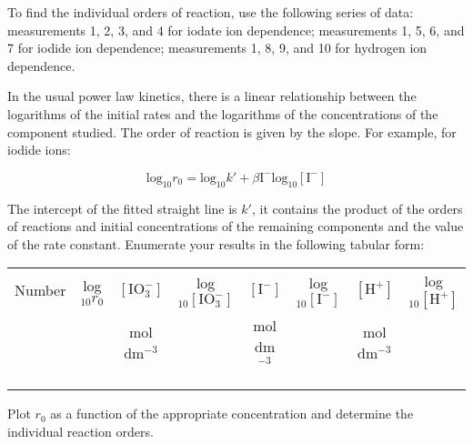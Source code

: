 To find the individual orders of reaction, use the following series of data: measurements 1, 2, 3, and 4 for iodate ion dependence; measurements 1, 5, 6, and 7 for iodide ion dependence; measurements 1, 8, 9, and 10 for hydrogen ion dependence.

In the usual power law kinetics, there is a linear relationship between the logarithms of the initial rates and the logarithms of the concentrations of the component studied. The order of reaction is given by the slope. For example, for iodide ions:

\begin{equation}
\text{log}_{10} r_0 = \text{log}_{10} k' + {\beta \text{I}^{-}} \text{log}_{10} [\text{I}^{-}]
\end{equation}

The intercept of the fitted straight line is $k'$, it contains the product of the orders of reactions and initial concentrations of the remaining components and the value of the rate constant. Enumerate your results in the following tabular form:

\begin{table}[H]
\begin{tabular}{|c|c|c|c|c|c|c|c|}
\hline
Number & log$_{10} r_0$ & $[\text{IO}_{3}^{-}]$ & log$_{10}[\text{IO}_{3}^{-}]$ & $[\text{I}^{-}]$ & log$_{10}[\text{I}^{-}]$ & $[\text{H}^{+}]$ & log$_{10}[\text{H}^{+}]$ \\

   &  & mol dm$^{-3}$ &  & mol dm$^{-3}$ &  & mol dm$^{-3}$ &  \\

\hline
 &  &  &  &  &  &  &  \\

\hline
&  &  &  &  &  &  &  \\

\hline
&  &  &  &  &  &  &  \\

\hline
\end{tabular}
\end{table}

Plot $r_0$ as a function of the appropriate concentration and determine the individual reaction orders.
